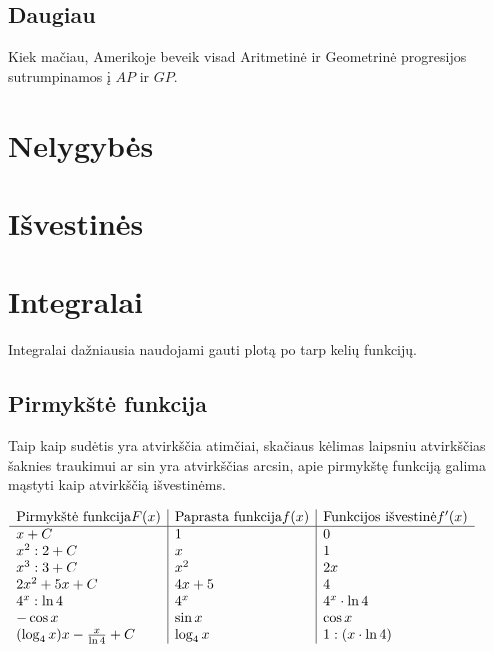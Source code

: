 \documentclass[fleqn]{article} %
\begin{document}
\subsection{Daugiau}
Kiek mačiau, Amerikoje beveik visad Aritmetinė ir Geometrinė progresijos sutrumpinamos į $AP$ ir $GP$.

\pagebreak

\section{Nelygybės}

% 

\section{Išvestinės}



\section{Integralai}

Integralai dažniausia naudojami gauti plotą po tarp kelių funkcijų. 

\subsection{Pirmykštė funkcija}

Taip kaip sudėtis yra atvirkščia atimčiai, skačiaus kėlimas laipsniu atvirkščias šaknies traukimui ar sin yra atvirkščias arcsin, apie pirmykštę funkciją galima mąstyti kaip atvirkščią išvestinėms. 

\begin{center}
    $\begin{array}{ l | l | l }
        \text{Pirmykštė funkcija} F(x) & \text{Paprasta funkcija} f(x) & \text{Funkcijos išvestinė} f^\prime(x) \\ \hline
        x + C                       & 1           & 0                 \\
        x^2 : 2 + C                 & x           & 1                 \\
        x^3 : 3 + C                 & x^2         & 2x                \\
        2x^2 + 5x + C               & 4x + 5      & 4                 \\
        4^x : \ln 4                 & 4^x         & 4^x \cdot \ln 4   \\
        -\cos x                     & \sin x      & \cos x            \\
        (\log_4x)x-\frac{x}{\ln4}+C & \log_4 x    & 1 : (x \cdot \ln 4) 
    \end{array}$
\end{center}
\end{document}
